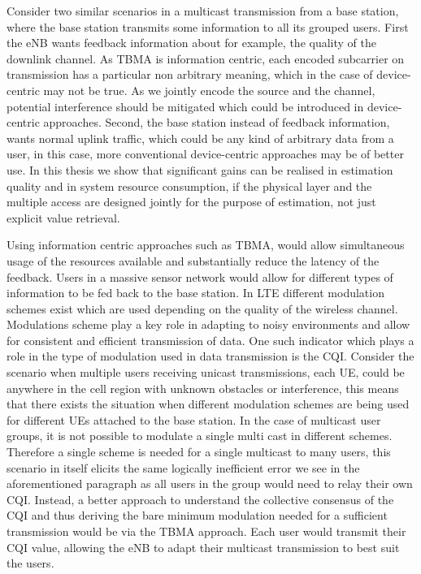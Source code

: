 \documentclass{article}
\begin{document}
Consider two similar scenarios in a multicast transmission from a base station, where the base station transmits some information to all its grouped users. First the eNB wants feedback information about for example, the quality of the downlink channel. As TBMA is information centric, each encoded subcarrier on transmission has a particular non arbitrary meaning, which in the case of device-centric may not be true. As we jointly encode the source and the channel, potential interference should be mitigated which could be introduced in device-centric approaches. Second, the base station instead of feedback information, wants normal uplink traffic, which could be any kind of arbitrary data from a user, in this case, more conventional device-centric approaches may be of better use. In this thesis we show that significant gains can be realised in estimation quality and in system resource consumption, if the physical layer and the multiple access are designed jointly for the purpose of estimation, not just explicit value retrieval.

Using information centric approaches such as TBMA, would allow simultaneous usage of the resources available and substantially reduce the latency of the feedback. Users in a massive sensor network would allow for different types of information to be fed back to the base station. In LTE different modulation schemes exist which are used depending on the quality of the wireless channel. Modulations scheme play a key role in adapting to noisy environments and allow for consistent and efficient transmission of data. One such indicator which plays a role in the type of modulation used in data transmission is the \ac{CQI}. Consider the scenario when multiple users receiving unicast transmissions, each UE, could be anywhere in the cell region with unknown obstacles or interference, this means that there exists the situation when different modulation schemes are being used for different UEs attached to the base station. In the case of multicast user groups, it is not possible to modulate a single multi cast in different schemes. Therefore a single scheme is needed for a single multicast to many users, this scenario in itself elicits the same logically inefficient error we see in the aforementioned paragraph as all users in the group would need to relay their own \ac{CQI}. Instead, a better approach to understand the collective consensus of the \ac{CQI} and thus deriving the bare minimum modulation needed for a sufficient transmission would be via the TBMA approach. Each user would transmit their \ac{CQI} value, allowing the \ac{eNB} to adapt their multicast transmission to best suit the users. 
\end{document}
